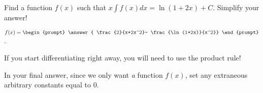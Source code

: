 \documentclass{ximera}
\author{Jim Talamo}
\begin{document}
\begin{exercise}
Find a function $f(x)$ such that $x \int f(x) dx = \ln(1+2x) +C$.  Simplify your answer!

$f(x) = \begin{prompt} \answer{ \frac{2}{x+2x^2}- \frac{\ln(1+2x)}{x^2}} \end{prompt}$.

\begin{hint}
If you start differentiating right away, you will need to use the product rule!  

In your final answer, since we only want \emph{a} function $f(x)$, set any extraneous arbitrary constants equal to 0.
\end{hint}

\end{exercise}
\end{document}
